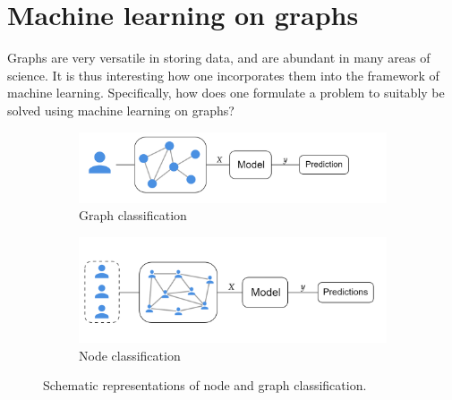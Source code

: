 
\section{Machine learning on graphs}
\label{sec:ml_on_graphs}

Graphs are very versatile in storing data, and are abundant in many areas of science. It is thus interesting how one incorporates them into the framework of machine learning. Specifically, how does one formulate a problem to suitably be solved using machine learning on graphs? 

%         

\begin{figure}[H]
    \centering
        \begin{subfigure}{.5\textwidth}
            \centering
            \includegraphics[width=.9\linewidth]{chapters/images_theory/graph_classification.png}
            \caption{Graph classification}
            \label{fig:graph_classification}
        \end{subfigure}%
        \begin{subfigure}{.5\textwidth}
            \centering
            \includegraphics[width=.9\linewidth]{chapters/images_theory/node_classification.png}
            \caption{Node classification}
            \label{fig:node_classification}
        \end{subfigure}
    \caption{Schematic representations of node and graph classification. }
    \label{fig:graph_and_node_class}
\end{figure}

